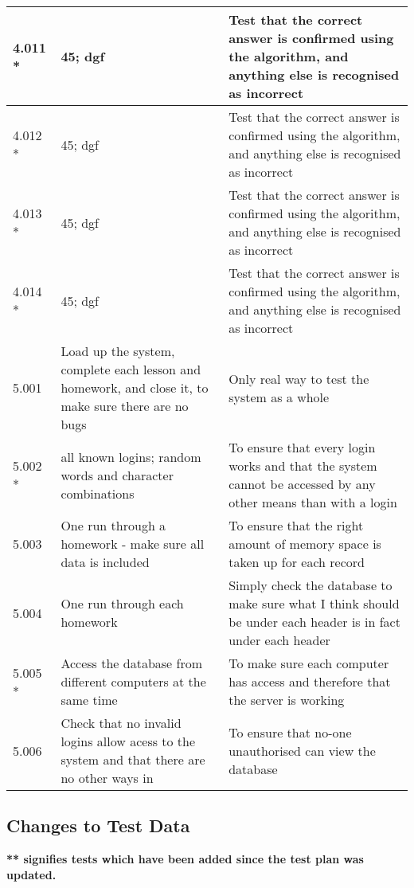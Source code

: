 \begin{landscape}
\begin{center}
\begin{longtable}{|p{4cm}|p{4cm}|p{5cm}|}
4.011 * & 45; dgf & Test that the correct answer is confirmed using the algorithm, and anything else is recognised as incorrect \\ \hline
4.012 * & 45; dgf & Test that the correct answer is confirmed using the algorithm, and anything else is recognised as incorrect \\ \hline
4.013 * & 45; dgf & Test that the correct answer is confirmed using the algorithm, and anything else is recognised as incorrect \\ \hline
4.014 * & 45; dgf & Test that the correct answer is confirmed using the algorithm, and anything else is recognised as incorrect \\ \hline
5.001 & Load up the system, complete each lesson and homework, and close it, to make sure there are no bugs & Only real way to test the system as a whole \\ \hline
5.002 * & all known logins; random words and character combinations & To ensure that every login works and that the system cannot be accessed by any other means than with a login \\ \hline
5.003 & One run through a homework - make sure all data is included & To ensure that the right amount of memory space is taken up for each record \\ \hline
5.004 & One run through each homework & Simply check the database to make sure what I think should be under each header is in fact under each header \\ \hline
5.005 * & Access the database from different computers at the same time & To make sure each computer has access and therefore that the server is working \\ \hline
5.006 & Check that no invalid logins allow acess to the system and that there are no other ways in & To ensure that no-one unauthorised can view the database \\ \hline
\end{longtable}
\end{center}

\subsection{Changes to Test Data}

\textbf{** signifies tests which have been added since the test plan was updated.}


\end{landscape}
